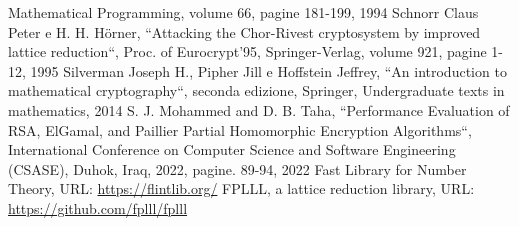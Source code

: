 \documentclass[a4paper,12pt]{report}
\theoremstyle{definition}
\begin{document}
\begin{thebibliography}{}
    Mathematical Programming, volume 66, pagine 181-199, 1994
    Schnorr Claus Peter e H. H. Hörner, 
    “Attacking the Chor-Rivest cryptosystem by improved lattice reduction“,
    Proc. of Eurocrypt'95, Springer-Verlag, volume 921, pagine 1-12, 1995
    Silverman Joseph H., Pipher Jill e Hoffstein Jeffrey, “An introduction to mathematical cryptography“,
    seconda edizione, Springer, Undergraduate texts in mathematics, 2014
    S. J. Mohammed and D. B. Taha, “Performance Evaluation of RSA, ElGamal, and Paillier 
    Partial Homomorphic Encryption Algorithms“, International Conference on Computer 
    Science and Software Engineering (CSASE), Duhok, Iraq, 2022, pagine. 89-94, 2022 
    Fast Library for Number Theory, URL: \url{https://flintlib.org/}
    FPLLL, a lattice reduction library, URL: \url{https://github.com/fplll/fplll}
   
\end{thebibliography}
% 
\end{document}
